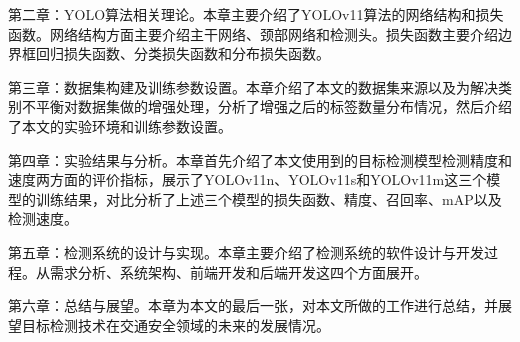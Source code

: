 第二章：YOLO算法相关理论。本章主要介绍了YOLOv11算法的网络结构和损失函数。网络结构方面主要介绍主干网络、颈部网络和检测头。损失函数主要介绍边界框回归损失函数、分类损失函数和分布损失函数。

第三章：数据集构建及训练参数设置。本章介绍了本文的数据集来源以及为解决类别不平衡对数据集做的增强处理，分析了增强之后的标签数量分布情况，然后介绍了本文的实验环境和训练参数设置。

第四章：实验结果与分析。本章首先介绍了本文使用到的目标检测模型检测精度和速度两方面的评价指标，展示了YOLOv11n、YOLOv11s和YOLOv11m这三个模型的训练结果，对比分析了上述三个模型的损失函数、精度、召回率、mAP以及检测速度。

第五章：检测系统的设计与实现。本章主要介绍了检测系统的软件设计与开发过程。从需求分析、系统架构、前端开发和后端开发这四个方面展开。

第六章：总结与展望。本章为本文的最后一张，对本文所做的工作进行总结，并展望目标检测技术在交通安全领域的未来的发展情况。
